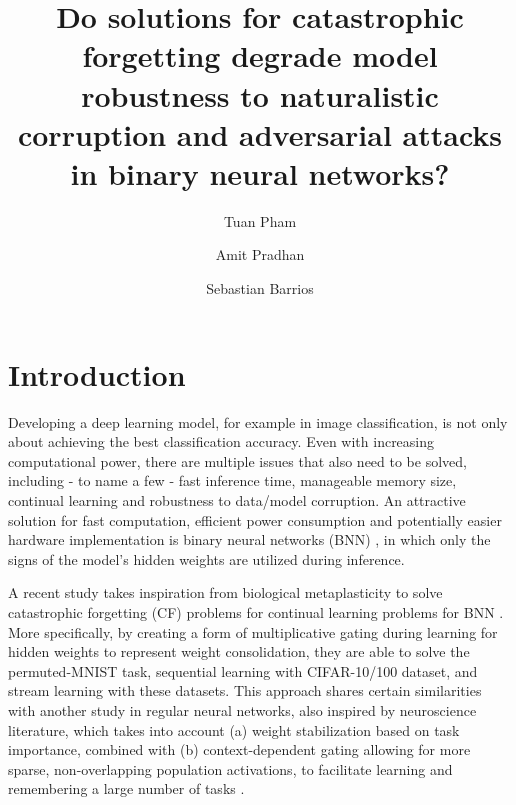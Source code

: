 \documentclass[manuscript,screen,review]{acmart}
\begin{document}
\title[Continual learning vesus robustness]{Do solutions for catastrophic forgetting degrade model robustness to naturalistic corruption and adversarial attacks in binary neural networks?}

\author{Tuan Pham}

\author{Amit Pradhan}

\author{Sebastian Barrios}


\begin{abstract}
  
\end{abstract}



\maketitle

\section{Introduction}
Developing a deep learning model, for example in image classification, is not only about achieving the best classification accuracy. Even with increasing computational power, there are multiple issues that also need to be solved, including - to name a few - fast inference time, manageable memory size, continual learning and robustness to data/model corruption. An attractive solution for fast computation, efficient power consumption and potentially easier hardware implementation is binary neural networks (BNN) \cite{DBLP:journals/corr/CourbariauxB16}, in which only the signs of the model’s hidden weights are utilized during inference. 

A recent study takes inspiration from biological metaplasticity to solve catastrophic forgetting (CF) problems for continual learning problems for BNN \cite{Laborieux_Ernoult_Hirtzlin_Querlioz_2021}. More specifically, by creating a form of multiplicative gating during learning for hidden weights to represent weight consolidation, they are able to solve the permuted-MNIST task, sequential learning with CIFAR-10/100 dataset, and stream learning with these datasets. This approach shares certain similarities with another study in regular neural networks, also inspired by neuroscience literature, which takes into account (a) weight stabilization based on task importance, combined with (b) context-dependent gating allowing for more sparse, non-overlapping population activations, to facilitate learning and remembering a large number of tasks \cite{Masse_2018}. 
\end{document}
